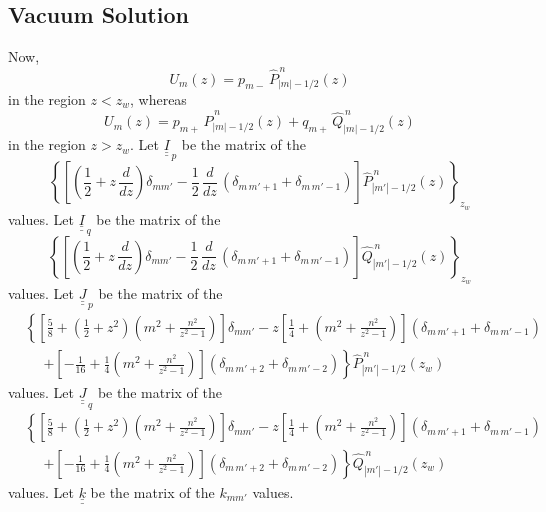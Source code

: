 \documentclass[12pt,prb,aps,notitlepage]{revtex4-1}
\begin{document}
\subsection{Vacuum Solution}
Now, 
\begin{equation}
U_m(z) = p_{m-}\,\hat{P}_{|m|-1/2}^{\,n}(z)
\end{equation}
in the region $z<z_w$, whereas 
\begin{equation}
U_m(z) =p_{m+}\,\hat{P}_{|m|-1/2}^{\,n}(z) + q_{m+}\,\hat{Q}_{|m|-1/2}^{\,n}(z) 
\end{equation}
in the region $z>z_w$. 
Let $\underline{\underline{I}}_{\,p}$ be the matrix of the
\begin{equation}
\left\{\left[\left(\frac{1}{2}+z\,\frac{d}{dz}\right)\delta_{mm'}-\frac{1}{2}\,\frac{d}{dz}\,(\delta_{m\,m'+1}+\delta_{m\,m'-1})\right]\hat{P}_{|m'|-1/2}^{\,n}(z)\right\}_{z_w}
\end{equation}
values.
Let $\underline{\underline{I}}_{\,q}$ be the matrix of the
\begin{equation}
\left\{\left[\left(\frac{1}{2}+z\,\frac{d}{dz}\right)\delta_{mm'}-\frac{1}{2}\,\frac{d}{dz}\,(\delta_{m\,m'+1}+\delta_{m\,m'-1})\right]\hat{Q}_{|m'|-1/2}^{\,n}(z)\right\}_{z_w}
\end{equation}
values. 
Let $\underline{\underline{J}}_{\,p}$ be the matrix of the 
\begin{align}
 &\left\{\left[\frac{5}{8} + \left(\frac{1}{2}+z^2\right)\left(m^2+\frac{n^2}{z^2-1}\right)\right]\delta_{mm'}
-z\left[\frac{1}{4}+ \left(m^2+\frac{n^2}{z^2-1}\right)\right](\delta_{m\,m'+1}+\delta_{m\,m'-1})\right.\nonumber\\[0.5ex]
&\phantom{=}\left.+\left[-\frac{1}{16}+\frac{1}{4} \left(m^2+\frac{n^2}{z^2-1}\right)\right](\delta_{m\,m'+2}+\delta_{m\,m'-2})\right\}\hat{P}_{|m'|-1/2}^{\,n}(z_w)
\end{align}
values. Let $\underline{\underline{J}}_{\,q}$ be the matrix of the 
\begin{align}
 &\left\{\left[\frac{5}{8} + \left(\frac{1}{2}+z^2\right)\left(m^2+\frac{n^2}{z^2-1}\right)\right]\delta_{mm'}
-z\left[\frac{1}{4}+ \left(m^2+\frac{n^2}{z^2-1}\right)\right](\delta_{m\,m'+1}+\delta_{m\,m'-1})\right.\nonumber\\[0.5ex]
&\phantom{=}\left.+\left[-\frac{1}{16}+\frac{1}{4} \left(m^2+\frac{n^2}{z^2-1}\right)\right](\delta_{m\,m'+2}+\delta_{m\,m'-2})\right\}\hat{Q}_{|m'|-1/2}^{\,n}(z_w)
\end{align}
values. 
Let $\underline{\underline{k}}$ be the matrix of the $k_{mm'}$ values. 
\end{document}
